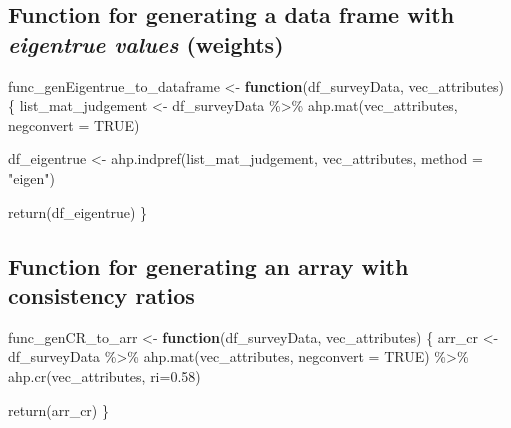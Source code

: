 \documentclass[
]{article}
\newenvironment{Shaded}{\begin{snugshade}}{\end{snugshade}}
\newcommand{\AttributeTok}[1]{\textcolor[rgb]{0.00,0.34,0.68}{#1}}
\newcommand{\ConstantTok}[1]{\textcolor[rgb]{0.67,0.33,0.00}{#1}}
\newcommand{\ControlFlowTok}[1]{\textcolor[rgb]{0.12,0.11,0.11}{\textbf{#1}}}
\newcommand{\FloatTok}[1]{\textcolor[rgb]{0.69,0.50,0.00}{#1}}
\newcommand{\FunctionTok}[1]{\textcolor[rgb]{0.39,0.29,0.61}{#1}}
\newcommand{\NormalTok}[1]{\textcolor[rgb]{0.12,0.11,0.11}{#1}}
\newcommand{\OtherTok}[1]{\textcolor[rgb]{0.00,0.43,0.16}{#1}}
\newcommand{\SpecialCharTok}[1]{\textcolor[rgb]{0.24,0.68,0.91}{#1}}
\newcommand{\StringTok}[1]{\textcolor[rgb]{0.75,0.01,0.01}{#1}}
\begin{document}
\hypertarget{function-for-generating-a-data-frame-with-eigentrue-values-weights}{%
\subsection{\texorpdfstring{Function for generating a data frame with
\emph{eigentrue values}
(weights)}{Function for generating a data frame with eigentrue values (weights)}}\label{function-for-generating-a-data-frame-with-eigentrue-values-weights}}

\begin{Shaded}
\begin{Highlighting}[]
\NormalTok{func\_genEigentrue\_to\_dataframe }\OtherTok{\textless{}{-}} \ControlFlowTok{function}\NormalTok{(df\_surveyData, vec\_attributes) \{}
\NormalTok{  list\_mat\_judgement }\OtherTok{\textless{}{-}}\NormalTok{ df\_surveyData }\SpecialCharTok{\%\textgreater{}\%} 
    \FunctionTok{ahp.mat}\NormalTok{(vec\_attributes, }\AttributeTok{negconvert =} \ConstantTok{TRUE}\NormalTok{)}
  
\NormalTok{  df\_eigentrue }\OtherTok{\textless{}{-}} \FunctionTok{ahp.indpref}\NormalTok{(list\_mat\_judgement, vec\_attributes, }\AttributeTok{method =} \StringTok{"eigen"}\NormalTok{)}

  \FunctionTok{return}\NormalTok{(df\_eigentrue)}
\NormalTok{\}}
\end{Highlighting}
\end{Shaded}

\hypertarget{function-for-generating-an-array-with-consistency-ratios}{%
\subsection{Function for generating an array with consistency
ratios}\label{function-for-generating-an-array-with-consistency-ratios}}

\begin{Shaded}
\begin{Highlighting}[]
\NormalTok{func\_genCR\_to\_arr }\OtherTok{\textless{}{-}} \ControlFlowTok{function}\NormalTok{(df\_surveyData, vec\_attributes) \{}
\NormalTok{  arr\_cr }\OtherTok{\textless{}{-}}\NormalTok{ df\_surveyData }\SpecialCharTok{\%\textgreater{}\%}
    \FunctionTok{ahp.mat}\NormalTok{(vec\_attributes, }\AttributeTok{negconvert =} \ConstantTok{TRUE}\NormalTok{) }\SpecialCharTok{\%\textgreater{}\%} 
    \FunctionTok{ahp.cr}\NormalTok{(vec\_attributes, }\AttributeTok{ri=}\FloatTok{0.58}\NormalTok{)}

  \FunctionTok{return}\NormalTok{(arr\_cr)}
\NormalTok{\}}
\end{Highlighting}
\end{Shaded}
\end{document}
